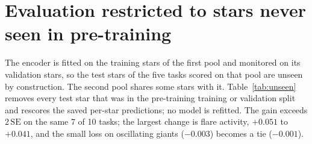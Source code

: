 \documentclass{article}
\begin{document}
\section{Evaluation restricted to stars never seen in pre-training}
\label{app:unseen}

The encoder is fitted on the training stars of the first pool and monitored on its validation stars,
so the test stars of
the five tasks scored on that pool are unseen by construction. The second pool shares some stars with
it. Table~\ref{tab:unseen} removes every test star that was in the pre-training training or validation
split and rescores the saved per-star predictions; no model is refitted. The gain exceeds
$2\,\mathrm{SE}$ on the same 7 of 10 tasks; the largest change is flare activity, $+0.051$ to
$+0.041$, and the small loss on oscillating giants ($-0.003$) becomes a tie ($-0.001$).

\begin{table}[H]
\caption{The fusion gain (features\,$\oplus\,\mu$ minus features, linear readout) on all test stars and
on the test stars never seen in pre-training. Bold: beyond $2\,\mathrm{SE}$ over six encoder seeds.}
\label{tab:unseen}
\centering
\scriptsize

\end{table}
\end{document}
